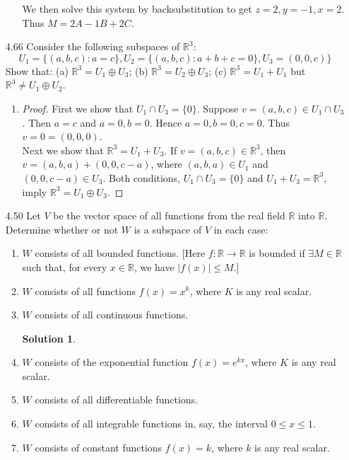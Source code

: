 \documentclass[12pt]{article}
\theoremstyle{plain}
\theoremstyle{definition}
\newtheorem*{solution}{Solution} %
\theoremstyle{plain}
\begin{document}
\begin{enumerate}
\begin{enumerate}
		We then solve this system by backsubstitution to get $z=2,y=-1,x=2$. Thus $M=2A-1B+2C$.
	\end{enumerate}
	
\item[4.66]Consider the following subspaces of $\mathbb{R}^3$:
\[ U_1=\{(a,b,c): a=c\},U_2=\{(a,b,c): a+b+c=0\}, U_3=(0,0,c)\} \]
Show that: (a) $\mathbb{R}^3=U_1\oplus U_3$; (b) $\mathbb{R}^3=U_2\oplus U_3$; (c) $\mathbb{R}^3=U_1+U_1$ but $\mathbb{R}^3\neq U_1\oplus U_2$.
	\begin{enumerate}
	\item
		\begin{proof}
		First we show that $U_1 \cap U_3 = \{0\}$. Suppose $v=(a,b,c)\in U_1 \cap U_3$. Then $a=c$ and $a=0,b=0$. Hence $a=0,b=0,c=0$. Thus $v=0=(0,0,0)$.\\
		Next we show that $\mathbb{R}^3 = U_1+U_3$. If $v=(a,b,c)\in \mathbb{R}^3$, then $v=(a,b,a)+(0,0,c-a)$, where $(a,b,a)\in U_1$ and $(0,0,c-a)\in U_3$. Both conditions, $U_1\cap U_3 = \{0\}$ and $U_1+U_3 =\mathbb{R}^3$, imply $\mathbb{R}^3 = U_1 \oplus U_3$.
		\end{proof}
	\end{enumerate}
	
\item[4.50]Let $V$ be the vector space of all functions from the real field $\mathbb{R}$ into $\mathbb{R}$. Determine whether or not $W$ is a subspace of $V$ in each case:
	\begin{enumerate}
	\item $W$ consists of all bounded functions. [Here $f: \mathbb{R}\rightarrow\mathbb{R}$ is bounded if $\exists M \in \mathbb{R}$ such that, for every $x\in \mathbb{R}$, we have $|f(x)| \leq M$.]
	\item $W$ consists of all functions $f(x)=x^k$, where $K$ is any real scalar.
	\item $W$ consists of all continuous functions.\\
		\begin{solution}
		
		\end{solution}
	\item $W$ consists of the exponential function $f(x)=e^{kx}$, where $K$ is any real scalar.
	\item $W$ consists of all differentiable functions.
	\item $W$ consists of all integrable functions in, say, the interval $0\leq x \leq 1$.
	\item $W$ consists of constant functions $f(x)=k$, where $k$ is any real scalar.
	\end{enumerate}
	

\end{enumerate}
\end{document}
